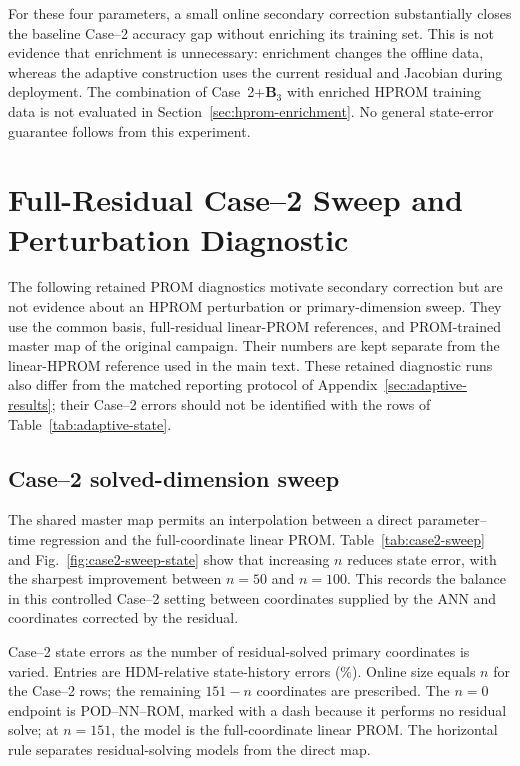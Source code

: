 \documentclass[11pt]{article}
\newcommand{\papertable}[1]{%
  \begingroup
  \small
  \setlength{\tabcolsep}{3.5pt}%
  \renewcommand{\arraystretch}{1.15}%
  \begin{adjustbox}{max width=\textwidth}
  
  \end{adjustbox}%
  \endgroup
}
\begin{document}
For these four parameters, a small online secondary correction substantially
closes the baseline Case--2 accuracy gap without enriching its training set.
This is not evidence that enrichment is unnecessary: enrichment changes the
offline data, whereas the adaptive construction uses the current residual
and Jacobian during deployment.  The combination of
Case~2+$\mathbf B_3$ with enriched HPROM training data is not evaluated in
Section~\ref{sec:hprom-enrichment}.
No general state-error guarantee follows from this experiment.

\section{Full-Residual Case--2 Sweep and Perturbation Diagnostic}
\label{sec:prom-results}
The following retained PROM diagnostics motivate secondary correction but
are not evidence about an HPROM perturbation or primary-dimension sweep.
They use the common basis, full-residual linear-PROM references, and
PROM-trained master map of the original campaign.  Their numbers are kept
separate from the linear-HPROM reference used in the main text.  These
retained diagnostic runs also differ from the matched reporting protocol
of Appendix~\ref{sec:adaptive-results}; their Case--2 errors should not
be identified with the rows of Table~\ref{tab:adaptive-state}.

\subsection{Case--2 solved-dimension sweep}
\label{sec:case2-sweep}
The shared master map permits an interpolation between a direct parameter--time
regression and the full-coordinate linear PROM.  Table~\ref{tab:case2-sweep}
and Fig.~\ref{fig:case2-sweep-state} show that increasing $n$ reduces state
error, with the sharpest improvement between $n=50$ and
$n=100$.  This records the balance in this controlled Case--2 setting between
coordinates supplied by the ANN and coordinates corrected by the residual.

\begin{table}[H]
\centering
\caption{Case--2 state errors as the number of residual-solved primary
coordinates is varied.  Entries are HDM-relative state-history errors (\%).
Online size equals $n$ for the Case--2 rows;
the remaining $151-n$ coordinates are prescribed.  The $n=0$ endpoint
is POD--NN--ROM, marked with a dash because it performs no residual solve;
at $n=151$, the model is the full-coordinate linear PROM.  The horizontal
rule separates residual-solving models from the direct map.}
\label{tab:case2-sweep}
\papertable{tables/euclidean_prom_only/euclidean_prom_case2_n_sweep_state_errors.tex}
\end{table}
\end{document}
